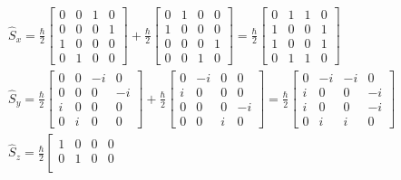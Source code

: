 \documentclass{article}
\begin{document}
\begin{enumerate}
\begin{enumerate}
{        \[
        \begin{aligned}
        & \hat{S}_{x} = \frac{\hbar}{2} \left[\begin{array}{llll}
        0 & 0 & 1 & 0 \\
        0 & 0 & 0 & 1 \\
        1 & 0 & 0 & 0 \\
        0 & 1 & 0 & 0
        \end{array}\right] + \frac{\hbar}{2} \left[\begin{array}{llll}
        0 & 1 & 0 & 0 \\
        1 & 0 & 0 & 0 \\
        0 & 0 & 0 & 1 \\
        0 & 0 & 1 & 0
        \end{array}\right] = \frac{\hbar}{2} \left[\begin{array}{llll}
        0 & 1 & 1 & 0 \\
        1 & 0 & 0 & 1 \\
        1 & 0 & 0 & 1 \\
        0 & 1 & 1 & 0
        \end{array}\right] \\
        & \hat{S}_{y} = \frac{\hbar}{2} \left[\begin{array}{llll}
        0 & 0 & -i & 0 \\
        0 & 0 & 0 & -i \\
        i & 0 & 0 & 0 \\
        0 & i & 0 & 0
        \end{array}\right] + \frac{\hbar}{2} \left[\begin{array}{llll}
        0 & -i & 0 & 0 \\
        i & 0 & 0 & 0 \\
        0 & 0 & 0 & -i \\
        0 & 0 & i & 0
        \end{array}\right] = \frac{\hbar}{2} \left[\begin{array}{llll}
        0 & -i & -i & 0 \\
        i & 0 & 0 & -i \\
        i & 0 & 0 & -i \\
        0 & i & i & 0
        \end{array}\right] \\
        & \hat{S}_{z} = \frac{\hbar}{2} \left[\begin{array}{llll}
        1 & 0 & 0 & 0 \\
        0 & 1 & 0 & 0 \\

\end{array}
\end{aligned}\]}
\end{enumerate}
\end{enumerate}
\end{document}
